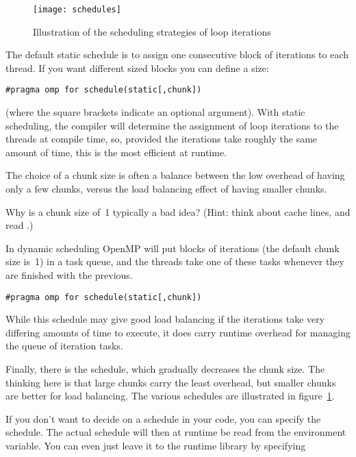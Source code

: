 \begin{figure}[ht]
  \texttt{[image: schedules]}
  \caption{Illustration of the scheduling strategies of loop iterations}
  \label{fig:omp-schedule}
\end{figure}

The default static schedule is to assign one consecutive block of
iterations to each thread. If you want different sized blocks you can
define a  size:
\begin{lstlisting}[language=omp]
#pragma omp for schedule(static[,chunk])
\end{lstlisting}
(where the square brackets indicate an optional argument).
With static scheduling,
the compiler will determine the assignment of loop iterations to the threads
at compile time,
so,
provided the iterations take roughly the same amount of time,
this is the most efficient at runtime.

The choice of a chunk size is often a balance between the low overhead of having 
only a few chunks, versus the load balancing effect of having smaller chunks.
\begin{exercise}
  Why is a chunk size of~1 typically a bad idea? (Hint: think about
  cache lines, and read .)
\end{exercise}

In dynamic scheduling OpenMP will put blocks of iterations
(the default chunk size is~1) in a task queue, and the threads take one of these
tasks whenever they are finished with the previous.
\begin{lstlisting}[language=omp]
#pragma omp for schedule(static[,chunk])
\end{lstlisting}
While this schedule may give good load balancing if the iterations
take very differing amounts of time to execute, it does carry runtime
overhead for managing the queue of iteration tasks.

Finally, there is the  schedule, which gradually decreases the chunk size.
The thinking here is that large chunks carry the least overhead, but smaller chunks are better
for load balancing.
%
The various schedules are illustrated in figure~\ref{fig:omp-schedule}.

If you don't want to decide on a schedule in your code, you can
specify the  schedule. The actual
schedule will then at runtime be read from the
 environment variable. You can even just
leave it to the runtime library by specifying

